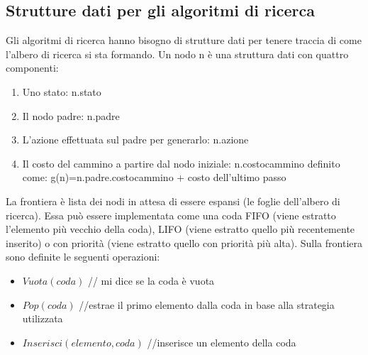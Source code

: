 \documentclass{article}
\begin{document}
\subsection{Strutture dati per gli algoritmi di ricerca}
Gli algoritmi di ricerca hanno bisogno di strutture dati per tenere traccia di come l'albero di ricerca si sta formando. \newline
Un nodo n è una struttura dati con quattro componenti:
\begin{enumerate}
    \item Uno stato: n.stato
    \item Il nodo padre: n.padre
    \item L'azione effettuata sul padre per generarlo: n.azione
    \item Il costo del cammino a partire dal nodo iniziale: n.costocammino definito come: \newline g(n)=n.padre.costocammino + costo dell'ultimo passo
\end{enumerate}
La frontiera è lista dei nodi in attesa di essere espansi (le foglie dell'albero di ricerca). Essa può essere implementata come una coda FIFO (viene estratto l'elemento più vecchio della coda), LIFO (viene estratto quello più recentemente inserito) o con priorità (viene estratto quello con priorità più alta). Sulla frontiera sono definite le seguenti operazioni:
\begin{itemize}
    \item $Vuota(coda)$ // mi dice se la coda è vuota
    \item $Pop(coda)$ //estrae il primo elemento dalla coda in base alla strategia utilizzata
    \item $Inserisci(elemento,coda)$ //inserisce un elemento della coda
\end{itemize}
\end{document}
